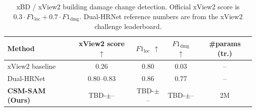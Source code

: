 \begin{table}[t]
\centering
\caption{xBD / xView2 building damage change detection. Official xView2
score is $0.3 \cdot F1_{\mathrm{loc}} + 0.7 \cdot F1_{\mathrm{dmg}}$.
Dual-HRNet reference numbers are from the xView2 challenge leaderboard.}
\label{tab:xbd}
\small
\begin{tabular}{lcccc}
\toprule
Method & xView2 score $\uparrow$ & $F1_{\mathrm{loc}}$ $\uparrow$ & $F1_{\mathrm{dmg}}$ $\uparrow$ & \#params (tr.) \\
\midrule
xView2 baseline~\cite{gupta2019xbd}               & 0.26      & 0.80 & 0.03 & -- \\
Dual-HRNet~\cite{gupta2019xbd}                    & 0.80--0.83 & 0.86 & 0.77 & -- \\
\midrule
\textbf{CSM-SAM (Ours)}                           & TBD-$\pm$-- & TBD-$\pm$-- & TBD-$\pm$-- & 2M \\ %
\bottomrule
\end{tabular}
\end{table}
